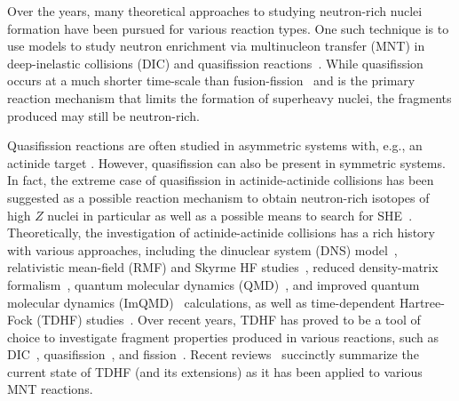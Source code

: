 Over the years, many theoretical approaches to studying neutron-rich nuclei formation have been pursued for various reaction types.
One such technique is to use models to study neutron enrichment via multinucleon transfer (MNT) in deep-inelastic collisions (DIC) and  quasifission reactions~\citep{adamian2003,zagrebaev2007,umar2008a,golabek2009,aritomo2009,kedziora2010,zhao2016,sekizawa2017a,wu2019}.
While quasifission occurs at a much shorter time-scale than fusion-fission~\citep{toke1985,durietz2011} and is the primary reaction mechanism that limits the formation of superheavy nuclei, the fragments produced may still be neutron-rich.

Quasifission reactions are often studied in asymmetric systems with, e.g., an actinide target \citep{toke1985,hinde1992,hinde1995,itkis2004,wakhle2014}.
However, quasifission can also be present in symmetric systems. In fact, the extreme case of quasifission in
actinide-actinide collisions has been suggested as a possible reaction mechanism to obtain neutron-rich isotopes of high $Z$ nuclei in particular as well as a possible means to search for SHE~\citep{majka2018,wuenschel2018}.
Theoretically, the investigation of actinide-actinide collisions has a rich history with various approaches, including the dinuclear system (DNS) model~\citep{penionzhkevich2005,adamian2008,feng2009a,adamian2010,adamian2010b,feng2017,zhu2017,bao2018b}, relativistic mean-field (RMF) and Skyrme HF studies~\citep{gupta2007b}, reduced density-matrix formalism~\citep{sargsyan2009}, quantum molecular dynamics (QMD)~\citep{zhao2009}, and improved quantum molecular dynamics (ImQMD)~\citep{tian2008,zhao2016,wang2016,yao2017,li2018} calculations, as well as time-dependent Hartree-Fock (TDHF) studies~\citep{cusson1980,golabek2009,kedziora2010}.
Over recent years, TDHF has proved to be a tool of choice to investigate fragment properties produced in various reactions, such as DIC~\citep{umar2017,wu2019},  quasifission~\citep{wakhle2014,oberacker2014,hammerton2015,umar2015c,umar2016,wang2016,sekizawa2017a,godbey2019,jiang2020}, and fission~\citep{simenel2014a,scamps2015a,goddard2015,tanimura2015,goddard2016,bulgac2016,tanimura2017,scamps2018,bulgac2018,scamps2019}.
Recent reviews~\citep{simenel2018,sekizawa2019} succinctly summarize the current state of TDHF (and its extensions) as it has been applied to various MNT reactions.


